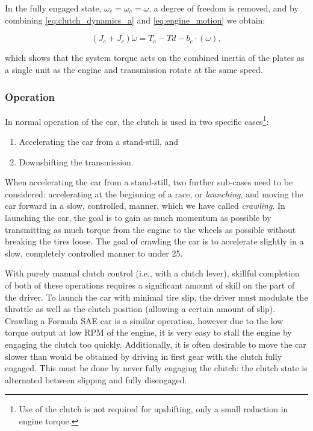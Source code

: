 In the fully engaged state, $\omega_e=\omega_c=\omega$, a degree of freedom is removed, and by combining \eqref{eq:clutch_dynamics_a} and \eqref{eq:engine_motion} we obtain:

\begin{equation}
  \left(J_e+J_c\right)\dot{\omega}=T_e-Td-b_c\cdot\left(\omega\right),
\end{equation}

which shows that the system torque acts on the combined inertia of the plates as a single unit as the engine and transmission rotate at the same speed.

\subsubsection{Operation}

In normal operation of the car, the clutch is used in two specific cases\footnote{Use of the clutch is not required for upshifting, only a small reduction in engine torque.}:
\begin{enumerate}
  \item Accelerating the car from a stand-still, and
  \item Downshifting the transmission.
\end{enumerate}

When accelerating the car from a stand-still, two further sub-cases need to be considered: accelerating at the beginning of a race, or \emph{launching}, and moving the car forward in a slow, controlled, manner, which we have called \emph{crawling}. In launching the car, the goal is to gain as much momentum as possible by transmitting as much torque from the engine to the wheels as possible without breaking the tires loose. The goal of crawling the car is to accelerate slightly in a slow, completely controlled manner to under \unit{25}{\kilo\metre\per\hour}.

With purely manual clutch control (i.e., with a clutch lever), skillful completion of both of these operations requires a significant amount of skill on the part of the driver. To launch the car with minimal tire slip, the driver must modulate the throttle as well as the clutch position (allowing a certain amount of slip). Crawling a Formula SAE car is a similar operation, however due to the low torque output at low RPM of the engine, it is very easy to stall the engine by engaging the clutch too quickly. Additionally, it is often desirable to move the car slower than would be obtained by driving in first gear with the clutch fully engaged. This must be done by never fully engaging the clutch: the clutch state is alternated between slipping and fully disengaged.

